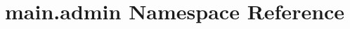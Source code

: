 \hypertarget{namespacemain_1_1admin}{}\section{main.\+admin Namespace Reference}
\label{namespacemain_1_1admin}
